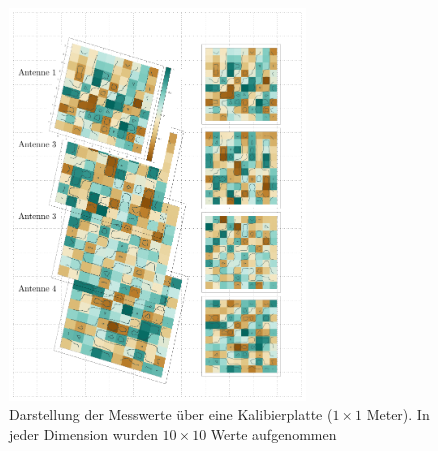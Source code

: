 \begin{figure}[ht!]
         \centering
         \includegraphics[width=0.7\textwidth]{img/complexitiy1.pdf}
         \caption[Reale Messwerte auf Kalibrierplatte]{Darstellung der Messwerte über eine Kalibierplatte ($1\times1$ Meter). In jeder Dimension wurden $10\times10$ Werte aufgenommen}
         \label{fig:Complexity1}
%
\end{figure}
%
